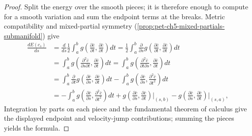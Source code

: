 \begin{proof}

  \sketch
  Split the energy over the smooth pieces; it is therefore enough to compute for
  a smooth variation and sum the endpoint terms at the breaks.  Metric compatibility
  and mixed-partial symmetry (\cref{prop:pet-ch5-mixed-partials-submanifold}) give
  \begin{align*}
    \frac{dE(c_s)}{ds}
    &=\frac{d}{ds}\frac12\int_a^bg\!\left(\frac{\partial\bar c}{\partial t},\frac{\partial\bar c}{\partial t}\right)dt
    =\frac12\int_a^b\frac{\partial}{\partial s}g\!\left(\frac{\partial\bar c}{\partial t},\frac{\partial\bar c}{\partial t}\right)dt\\
    &=\int_a^bg\!\left(\frac{\partial^2\bar c}{\partial s\partial t},\frac{\partial\bar c}{\partial t}\right)dt
    =\int_a^bg\!\left(\frac{\partial^2\bar c}{\partial t\partial s},\frac{\partial\bar c}{\partial t}\right)dt\\
    &=\int_a^b\frac{\partial}{\partial t}g\!\left(\frac{\partial\bar c}{\partial s},\frac{\partial\bar c}{\partial t}\right)dt
      -\int_a^bg\!\left(\frac{\partial\bar c}{\partial s},\frac{\partial^2\bar c}{\partial t^2}\right)dt\\
    &=-\int_a^bg\!\left(\frac{\partial\bar c}{\partial s},\frac{\partial^2\bar c}{\partial t^2}\right)dt
      +g\!\left(\frac{\partial\bar c}{\partial s},\frac{\partial\bar c}{\partial t}\right)\Big|_{(s,b)}
      -g\!\left(\frac{\partial\bar c}{\partial s},\frac{\partial\bar c}{\partial t}\right)\Big|_{(s,a)},
  \end{align*}
  Integration by parts on each piece and the fundamental theorem of calculus give
  the displayed endpoint and velocity-jump contributions; summing the pieces yields
  the formula.
\end{proof}

